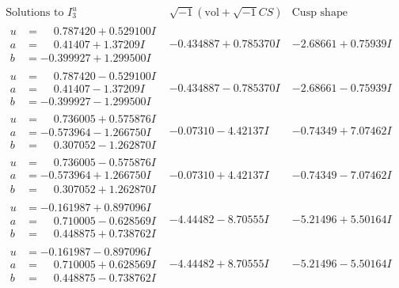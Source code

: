 \documentclass[1p]{elsarticle_modified}
\theoremstyle{definition}
\newcommand{\I}{\sqrt{-1}}
\begin{document}
$$\begin{array}{c|c|c}  
\text{Solutions to }I^u_{3}& \I (\text{vol} + \sqrt{-1}CS) & \text{Cusp shape}\\
 \hline 
\begin{aligned}
u &= \phantom{-}0.787420 + 0.529100 I \\
a &= \phantom{-}0.41407 + 1.37209 I \\
b &= -0.399927 + 1.299500 I\end{aligned}
 & -0.434887 + 0.785370 I & -2.68661 + 0.75939 I \\ \hline\begin{aligned}
u &= \phantom{-}0.787420 - 0.529100 I \\
a &= \phantom{-}0.41407 - 1.37209 I \\
b &= -0.399927 - 1.299500 I\end{aligned}
 & -0.434887 - 0.785370 I & -2.68661 - 0.75939 I \\ \hline\begin{aligned}
u &= \phantom{-}0.736005 + 0.575876 I \\
a &= -0.573964 - 1.266750 I \\
b &= \phantom{-}0.307052 - 1.262870 I\end{aligned}
 & -0.07310 - 4.42137 I & -0.74349 + 7.07462 I \\ \hline\begin{aligned}
u &= \phantom{-}0.736005 - 0.575876 I \\
a &= -0.573964 + 1.266750 I \\
b &= \phantom{-}0.307052 + 1.262870 I\end{aligned}
 & -0.07310 + 4.42137 I & -0.74349 - 7.07462 I \\ \hline\begin{aligned}
u &= -0.161987 + 0.897096 I \\
a &= \phantom{-}0.710005 - 0.628569 I \\
b &= \phantom{-}0.448875 + 0.738762 I\end{aligned}
 & -4.44482 - 8.70555 I & -5.21496 + 5.50164 I \\ \hline\begin{aligned}
u &= -0.161987 - 0.897096 I \\
a &= \phantom{-}0.710005 + 0.628569 I \\
b &= \phantom{-}0.448875 - 0.738762 I\end{aligned}
 & -4.44482 + 8.70555 I & -5.21496 - 5.50164 I \\ \hline\begin{aligned}

\end{aligned}
\end{array}$$
\end{document}
